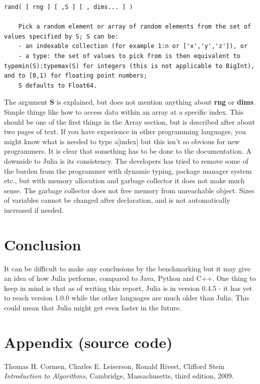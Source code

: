 \documentclass[a4paper,11pt]{article}
\begin{document}
\begin{lstlisting}
rand( [ rng ] [ ,S ] [ , dims... ] )

	Pick a random element or array of random elements from the set of values specified by S; S can be:
	- an indexable collection (for example 1:n or ['x','y','z']), or  
	- a type: the set of values to pick from is then equivalent to typemin(S):typemax(S) for integers (this is not applicable to BigInt), and to [0,1) for floating point numbers;  
	S defaults to Float64.
\end{lstlisting} 
The argument \textbf{S} is explained, but does not mention anything about \textbf{rng} or \textbf{dims}.
Simple things like how to access data within an array at a specific index. This should be one of the first things in the Array section, but is described after about two pages of text. If you have experience in other programming languages, you might know what is needed to type a[index] but this isn’t so obvious for new programmers. It is clear that something has to be done to the documentation.  
A downside to Julia is its consistency. The developers has tried to remove some of the burden from the programmer with dynamic typing, package manager system etc., but with memory allocation and garbage collector it does not make much sense. The garbage collector does not free memory from unreachable object. Sizes of variables cannot be changed after declaration, and is not automatically increased if needed.

\section{Conclusion}
It can be difficult to make any conclusions by the benchmarking but it may give an idea of how Julia performs, compared to Java, Python and C++. One thing to keep in mind is that as of writing this report, Julia is in version 0.4.5 - it has yet to reach version 1.0.0 while the other languages are much older than Julia. This could mean that Julia might get even faster in the future.   

\newpage

\section{Appendix (source code)}

%
%

\begin{thebibliography}{9}
	
	Thomas H. Cormen, Charles E. Leiserson, Ronald Rivest, Clifford Stein
	\emph{Introduction to Algorithms},
	Cambridge, Massachusetts,
	third edition,
	2009.
	
\end{thebibliography}
\end{document}

